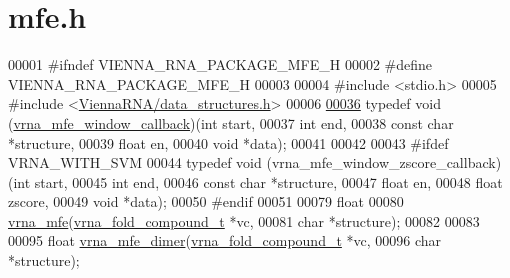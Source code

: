 \hypertarget{mfe_8h_source}{}\section{mfe.\+h}
\label{mfe_8h_source}

\begin{DoxyCode}
00001 \textcolor{preprocessor}{#ifndef VIENNA\_RNA\_PACKAGE\_MFE\_H}
00002 \textcolor{preprocessor}{#define VIENNA\_RNA\_PACKAGE\_MFE\_H}
00003 
00004 \textcolor{preprocessor}{#include <stdio.h>}
00005 \textcolor{preprocessor}{#include <\hyperlink{data__structures_8h}{ViennaRNA/data\_structures.h}>}
00006 
\hyperlink{group__mfe__fold_ga4f3e5bc214ef803074ace313cb9571b4}{00036} \textcolor{keyword}{typedef} void (\hyperlink{group__mfe__fold_ga4f3e5bc214ef803074ace313cb9571b4}{vrna\_mfe\_window\_callback})(\textcolor{keywordtype}{int}         start,
00037                                         \textcolor{keywordtype}{int}         end,
00038                                         \textcolor{keyword}{const} \textcolor{keywordtype}{char}  *structure,
00039                                         \textcolor{keywordtype}{float}       en,
00040                                         \textcolor{keywordtype}{void}        *data);
00041 
00042 
00043 \textcolor{preprocessor}{#ifdef VRNA\_WITH\_SVM}
00044 \textcolor{keyword}{typedef} void (vrna\_mfe\_window\_zscore\_callback)(\textcolor{keywordtype}{int}        start,
00045                                                \textcolor{keywordtype}{int}        end,
00046                                                \textcolor{keyword}{const} \textcolor{keywordtype}{char} *structure,
00047                                                \textcolor{keywordtype}{float}      en,
00048                                                \textcolor{keywordtype}{float}      zscore,
00049                                                \textcolor{keywordtype}{void}       *data);
00050 \textcolor{preprocessor}{#endif}
00051 
00079 \textcolor{keywordtype}{float}
00080 \hyperlink{group__mfe__fold_gabd3b147371ccf25c577f88bbbaf159fd}{vrna\_mfe}(\hyperlink{group__fold__compound_structvrna__fc__s}{vrna\_fold\_compound\_t} *vc,
00081          \textcolor{keywordtype}{char}                 *structure);
00082 
00083 
00095 \textcolor{keywordtype}{float} \hyperlink{group__mfe__cofold_gaab22d10c1190f205f16a77cab9d5d3ee}{vrna\_mfe\_dimer}(\hyperlink{group__fold__compound_structvrna__fc__s}{vrna\_fold\_compound\_t} *vc,
00096                      \textcolor{keywordtype}{char}                 *structure);

\end{DoxyCode}
